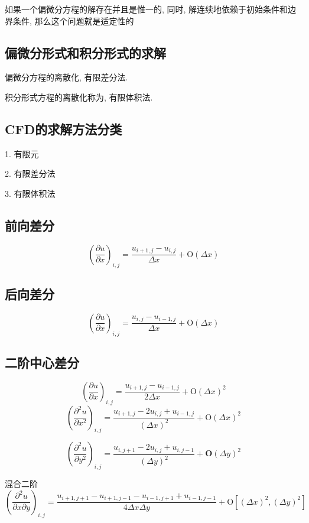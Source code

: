 \documentclass[UTF8]{ctexart}
\begin{document}
如果一个偏微分方程的解存在并且是惟一的, 同时, 解连续地依赖于初始条件和边界条件, 那么这个问题就是适定性的

\subsection{偏微分形式和积分形式的求解}
偏微分方程的离散化, 有限差分法.

积分形式方程的离散化称为, 有限体积法.

\subsection{CFD的求解方法分类}
1. 有限元

2. 有限差分法

3. 有限体积法
\subsection{前向差分}
$$
	\left(\frac{\partial u}{\partial x}\right)_{i, j}=\frac{u_{i+1, j}-u_{i, j}}{\Delta x}+\mathrm{O}(\Delta x)
$$

\subsection{后向差分}
$$
	\left(\frac{\partial u}{\partial x}\right)_{i, j}=\frac{u_{i, j}-u_{i-1, j}}{\Delta x}+\mathrm{O}(\Delta x)
$$

\subsection{二阶中心差分}
$$
	\left(\frac{\partial u}{\partial x}\right)_{i, j}=\frac{u_{i+1, j}-u_{i-1, j}}{2 \Delta x}+\mathrm{O}(\Delta x)^{2}
$$
$$
	\left(\frac{\partial^{2} u}{\partial x^{2}}\right)_{i, j}=\frac{u_{i+1, j}-2 u_{i, j}+u_{i-1, j}}{(\Delta x)^{2}}+\mathrm{O}(\Delta x)^{2}
$$

$$
	\left(\frac{\partial^{2} u}{\partial y^{2}}\right)_{i, j}=\frac{u_{i, j+1}-2 u_{i, j}+u_{i, j-1}}{(\Delta y)^{2}}+\mathbf{O}(\Delta y)^{2}
$$

混合二阶
$$
	\left(\frac{\partial^{2} u}{\partial x \partial y}\right)_{i, j}=\frac{u_{i+1, j+1}-u_{i+1, j-1}-u_{i-1, j+1}+u_{i-1, j-1}}{4 \Delta x \Delta y}+\mathrm{O}\left[(\Delta x)^{2},(\Delta y)^{2}\right]
$$
\end{document}
